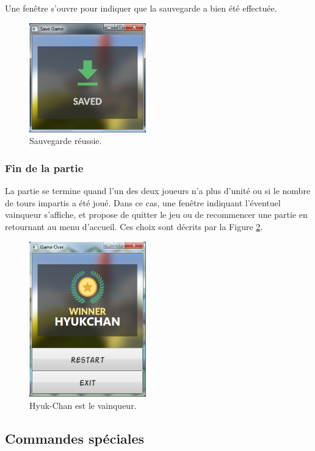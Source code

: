 \documentclass[a4paper]{article}
\begin{document}
		Une fenêtre s'ouvre pour indiquer que la sauvegarde a bien été effectuée.
		\begin{figure}[h!]
			\centering
			\includegraphics[width=0.45\textwidth]{../../IHM/saveOk.png}
			\caption{Sauvegarde réussie.}
			\label{fig:saveOk}
		\end{figure}

		\newpage\subsubsection{Fin de la partie}
		La partie se termine quand l'un des deux joueurs n'a plus d'unité ou si le nombre de tours impartis a été joué. Dans ce cas, une fenêtre indiquant l'éventuel vainqueur s'affiche, et propose de quitter le jeu ou de recommencer une partie en retournant au menu d'accueil. Ces choix sont décrits par la Figure \ref{fig:fin}.
		\begin{figure}[h!]
			\centering
			\includegraphics[width=0.45\textwidth]{../../IHM/fin.png}
			\caption{Hyuk-Chan est le vainqueur.}
			\label{fig:fin}
		\end{figure}

	\newpage\subsection{Commandes spéciales}
\end{document}
